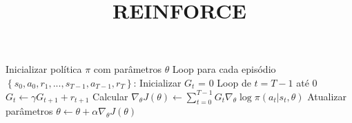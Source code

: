 \documentclass[brazilian,preview]{standalone}
\title{REINFORCE}
\begin{document}
\begin{algorithm}
Inicializar política $\pi$ com parâmetros $\theta$
Loop para cada episódio $\left\{s_0, a_0, r_1, ..., s_{T-1}, a_{T-1}, r_T \right\}$:
    Inicializar $G_t$ = 0
    Loop de $t = T-1$ até $0$
        $G_t \leftarrow \gamma G_{t+1} + r_{t+1}$
    Calcular $\nabla_\theta J\left(\theta\right) \leftarrow \sum\limits_{t=0}^{T-1} G_t \nabla_{\theta}\log \pi\left(a_t| s_t, \theta\right)$
    Atualizar parâmetros $\theta \leftarrow \theta + \alpha \nabla_\theta J\left(\theta\right)$
\end{algorithm}
\end{document}
